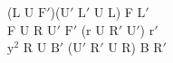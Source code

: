 (L U $\text{F}'$)($\text{U}'$ $\text{L}'$ U L) F $\text{L}'$\\
F U R $\text{U}'$ $\text{F}'$ (r U $\text{R}'$ $\text{U}'$) $\text{r}'$\\
$\text{y}^2$ R U $\text{B}'$ ($\text{U}'$ $\text{R}'$ U R) B $\text{R}'$\\
